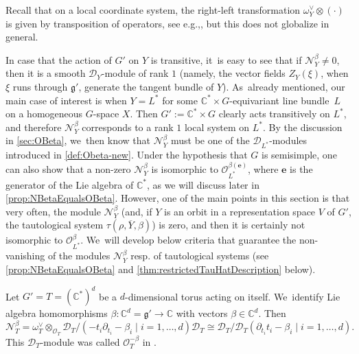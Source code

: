 \documentclass[11pt]{article}
\newcommand{\eg}{e.g.,\xspace}
\newcommand{\resp}{resp.\xspace}
\let\mathds\mathbb
\newcommand{\bme}{{\boldsymbol{e}}}
\newcommand{\dC}{{\mathds C}}\let\C\dC
\newcommand{\cD}{\mathscr{D}}
\newcommand{\cO}{\mathcal{O}}\let\O\cO
\newcommand{\frg}{\mathfrak{g}}
\begin{document}
Recall that on a local coordinate system, the right-left transformation $\omega_Y^\vee \otimes (\cdot)$ is given by transposition of operators, see \eg \cite[\S 1.2]{Hotta}, but this does not globalize in general.

\begin{rmk}\label{rem:LocSysRkOne}
In case that the action of $G'$ on $Y$ is transitive, it~is easy to see that if $\mathscr N_Y^\beta\neq 0$, then it is a smooth $\cD_Y$\nobreakdash-mod\-ule of rank $1$ (namely, the vector fields $Z_Y(\xi)$, when $\xi$ runs through $\frg'$, generate the tangent bundle of $Y$). As~already mentioned, our main case of interest is when $Y=L^*$ for some $\dC^*\times G$-equivariant line bundle~$L$ on a homogeneous $G$-space $X$. Then $G':=\C^*\times G$ clearly acts transitively on $L^*$, and therefore $\mathscr N_Y^\beta$ corresponds to a rank $1$ local system on $L^*$. By the discussion in \cref{sec:OBeta}, we~then know that $\mathscr N_Y^\beta$ must be one of the $\cD_{L^*}$\nobreakdash-mod\-ules introduced in \cref{def:Obeta-new}. Under the hypothesis that $G$ is semisimple, one can also show that a non-zero $\mathscr{N}_Y^\beta$ is isomorphic to
$\cO_{L^*}^{\beta(\bme)}$, where $\bme$ is the generator of the Lie algebra of $\C^*$, as we will discuss later in \cref{prop:NBetaEqualsOBeta}. However, one of the main points in this section is that very often, the module $\mathscr N_Y^\beta$ (and, if $Y$ is an orbit in a representation space $V$ of $G'$, the tautological system $\tau(\rho,\overline{Y},\beta)$) is zero, and then it is certainly not isomorphic to $\cO_{L^*}^{\beta}$. We~will develop below criteria that guarantee the non-vanishing of the modules $\mathscr N_Y^\beta$ \resp of tautological systems (see \cref{prop:NBetaEqualsOBeta} and \cref{thm:restrictedTauHatDescription} below).
\end{rmk}

\begin{exa}
Let $G' = T = (\C^*)^d$ be a $d$-dimensional torus acting on itself. We~identify Lie algebra homomorphisms $\beta \colon \C^d = \frg' \to \C$ with vectors $\beta \in \C^d$. Then
\[
\mathscr N_T^\beta = \omega_T^\vee \otimes_{\O_T} \mathscr{D}_T/(-t_i \partial_{t_i}-\beta_i \mid i = 1,\dots,d)\mathscr{D}_T \cong \mathscr{D}_T/\mathscr{D}_T(\partial_{t_i} t_i-\beta_i \mid i = 1,\dots,d).
\]
This $\mathscr D_T$\nobreakdash-mod\-ule was called $\O_T^{-\beta}$ in \cite{RS20}. \end{exa}
\end{document}
